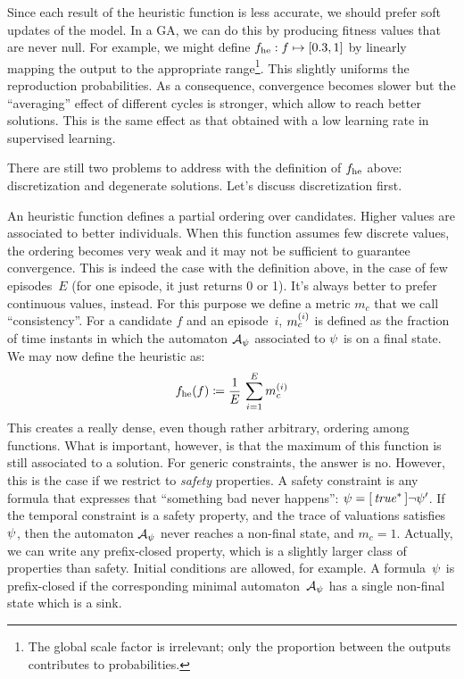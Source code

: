 Since each result of the heuristic function is less accurate, we should prefer
soft updates of the model. In a GA, we can do this by producing fitness values
that are never null. For example, we might define $f_{\text{he}}: f \mapsto
[0.3, 1]$ by linearly mapping the output to the appropriate range\footnote{The
global scale factor is irrelevant; only the proportion between the outputs
contributes to probabilities.}. This slightly uniforms the reproduction
probabilities. As a consequence, convergence becomes slower but the
``averaging'' effect of different cycles is stronger, which allow to reach
better solutions. This is the same effect as that obtained with a low
learning rate in supervised learning.

There are still two problems to address with the definition of $f_{\text{he}}$
above: discretization and degenerate solutions. Let's discuss discretization
first.

An heuristic function defines a partial ordering over candidates. Higher
values are associated to better individuals.  When this function assumes few
discrete values, the ordering becomes very weak and it may not be sufficient
to guarantee convergence. This is indeed the case with the definition above,
in the case of few episodes~$E$ (for one episode, it just returns 0 or 1).
It's always better to prefer continuous values, instead. For this purpose we
define a metric $m_c$ that we call ``consistency''. For a candidate $f$ and an
episode~$i$, $m_c^{(i)}$ is defined as the fraction of time instants in
which the automaton $\mathcal{A}_\psi$ associated to $\psi$ is on
a final state. We may now define the heuristic as:
\begin{equation}
	f_{\text{he}}(f) \coloneqq \frac{1}{E}\,\sum_{i=1}^E m_c^{(i)}
\end{equation}
This creates a really dense, even though rather arbitrary, ordering among
functions. What is important, however, is that the maximum of this function is
still associated to a solution. For generic constraints, the answer is no.
However, this is the case if we restrict to \emph{safety} properties. A safety
constraint is any formula that expresses that ``something bad never happens'':
$\psi = [\, {\text{\textit{true}}^*} \,]\neg\psi'$. If the temporal constraint
is a safety property, and the trace of valuations satisfies $\psi$,
then the automaton $\mathcal{A}_\psi$ never reaches a non-final state, and
$m_c = 1$. Actually, we can write any prefix-closed property, which is
a slightly larger class of properties than safety. Initial conditions are
allowed, for example. A formula~$\psi$ is prefix-closed if the
corresponding minimal automaton~$\mathcal{A}_\psi$ has a single non-final
state which is a sink.

